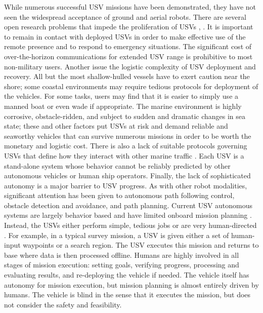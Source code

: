 \documentclass{tamuccthesis}
\begin{document}
While numerous successful USV missions have been demonstrated, they have not seen the widespread acceptance of ground and aerial robots. There are several open research problems that impede the proliferation of USVs \cite{bertram2008unmanned}, \cite{liu:2016}. It is important to remain in contact with deployed USVs in order to make effective use of the remote presence and to respond to emergency situations. The significant cost of over-the-horizon communications for extended USV range is prohibitive to most non-military users. Another issue the logistic complexity of USV deployment and recovery. All but the most shallow-hulled vessels have to exert caution near the shore; some coastal environments may require tedious protocols for deployment of the vehicles. For some tasks, users may find that it is easier to simply use a manned boat or even wade if appropriate. The marine environment is highly corrosive, obstacle-ridden, and subject to sudden and dramatic changes in sea state; these and other factors put USVs at risk and demand reliable and seaworthy vehicles that can survive numerous missions in order to be worth the monetary and logistic cost. There is also a lack of suitable protocols governing USVs that define how they interact with other marine traffic \cite{manley2008unmanned}. Each USV is a stand-alone system whose behavior cannot be reliably predicted by other autonomous vehicles or human ship operators. Finally, the lack of sophisticated autonomy is a major barrier to USV progress. As with other robot modalities, significant attention has been given to autonomous path following control, obstacle detection and avoidance, and path planning. Current USV autonomous systems are largely behavior based and have limited onboard mission planning \cite{liu:2016}. Instead, the USVs either perform simple, tedious jobs or are very human-directed \cite{manley2008unmanned}. For example, in a typical survey mission, a USV is given either a set of human-input waypoints or a search region. The USV executes this mission and returns to base where data is then processed offline. Humans are highly involved in all stages of mission execution: setting goals, verifying progress, processing and evaluating results, and re-deploying the vehicle if needed. The vehicle itself has autonomy for mission execution, but mission planning is almost entirely driven by humans. The vehicle is blind in the sense that it executes the mission, but does not consider the safety and feasibility. 
\end{document}
